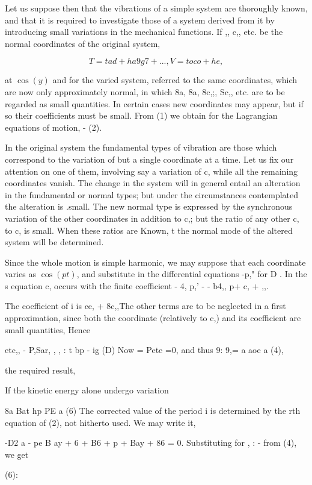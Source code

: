 Let us suppose then that the vibrations of a simple system are thoroughly
known, and that it is required to investigate those of a system derived from it
by introducing small variations in the mechanical functions. If ,, c,, etc. be
the normal coordinates of the original system,

\[T=tad + ha9g7+..., V=to co+he,\]

at \(\cos(y)\) and for the varied system, referred to the same coordinates,
which are now only approximately normal, in which 8a, 8a, 8c,;, Sc,, etc. are
to be regarded as small quantities.  In certain cases new coordinates may
appear, but if so their coefficients must be small. From (1) we obtain for the
Lagrangian equations of motion, - (2).

In the original system the fundamental types of vibration are those which
correspond to the variation of but a single coordinate at a time.  Let us fix
our attention on one of them, involving say a variation of c, while all the
remaining coordinates vanish. The change in the system will in general entail
an alteration in the fundamental or normal types; but under the circumstances
contemplated the alteration is .small. The new normal type is expressed by the
synchronous variation of the other coordinates in addition to c,; but the ratio
of any other c, to c, is small. When these ratios are Known, t the normal mode
of the altered system will be determined.

Since the whole motion is simple harmonic, we may suppose that each coordinate
varies as \(\cos(pt)\), and substitute in the differential equations -p," for D
. In the s equation c, occurs with the finite coefficient - 4, p,' - - b4,, p+
c, + ,,.

The coefficient of i is ce, + 8c,,The other terms are to be neglected in a
first approximation, since both the coordinate (relatively to c,) and its
coefficient are small quantities, Hence

etc,, - P,Sar, , , : t bp - ig (D) Now = Pete =0, and thus 9: 9,= a aoe a (4),

the required result,

If the kinetic energy alone undergo variation

8a Bat hp PE a (6) The corrected value of the period i is determined by the rth
equation of (2), not hitherto used. We may write it,

-D2 a - pe B ay + 6 + B6 + p + Bay + 86 = 0. Substituting for , : - from (4),
we get

(6):

